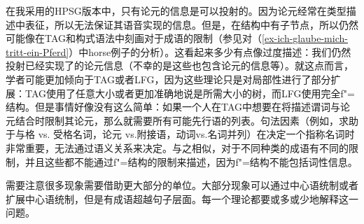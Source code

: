 在我采用的HPSG版本中，只有论元的信息是可以投射的。因为论元经常在类型描述中表征，所以无法保证其语音实现的信息。但是，在结构中有子节点，所以仍然可能像在TAG和构式语法中刻画对于成语的限制（参见对（\ref{ex-ich-glaube-mich-tritt-ein-Pferd}）中horse例子的分析）。这看起来多少有点像过度描述：我们仍然投射已经实现了的论元信息（不幸的是这些也包含论元的信息等）。就这点而言，学者可能更加倾向于TAG或者LFG，因为这些理论只是对局部性进行了部分扩展：TAG使用了任意大小或者更加准确地说是所需大小的树，而LFG使用完全f"=结构。但是事情好像没有这么简单：如果一个人在TAG中想要在将描述谓词与论元结合时限制其论元，那么就需要所有可能先行语的列表。句法因素（例如，求助于与格 vs. 受格名词，论元 vs.附接语，动词vs.名词并列）在决定一个指称名词时非常重要，无法通过语义关系来决定。与之相似，对于不同种类的成语有不同的限制，并且这些都不能通过f"=结构的限制来描述，因为f"=结构不能包括词性信息。

需要注意很多现象需要借助更大部分的单位。大部分现象可以通过中心语统制或者扩展中心语统制，但是有成语超越句子层面。每一个理论都要或多或少地解释这一问题。



